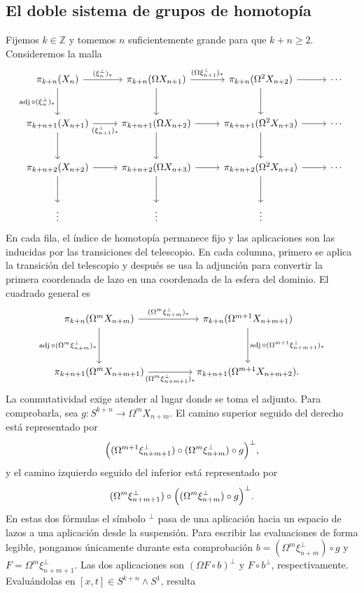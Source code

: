 \subsection{El doble sistema de grupos de homotopía}

Fijemos $k\in\mathbb Z$ y tomemos $n$ suficientemente grande para que $k+n\ge2$. Consideremos la malla
\[
\begin{tikzcd}[column sep=2.5em,row sep=large]
\pi_{k+n}(X_n)
\arrow[r,"(\xi_n^{\perp})_*"]
\arrow[d,"\operatorname{adj}\circ(\xi_n^{\perp})_*"']
& \pi_{k+n}(\Omega X_{n+1})
\arrow[r,"(\Omega\xi_{n+1}^{\perp})_*"] \arrow[d]
& \pi_{k+n}(\Omega^2X_{n+2}) \arrow[r] \arrow[d] & \cdots\\
\pi_{k+n+1}(X_{n+1}) \arrow[r,"(\xi_{n+1}^{\perp})_*"'] \arrow[d]
& \pi_{k+n+1}(\Omega X_{n+2}) \arrow[r] \arrow[d]
& \pi_{k+n+1}(\Omega^2X_{n+3}) \arrow[r] \arrow[d] & \cdots\\
\pi_{k+n+2}(X_{n+2}) \arrow[r] \arrow[d]
& \pi_{k+n+2}(\Omega X_{n+3}) \arrow[r] \arrow[d]
& \pi_{k+n+2}(\Omega^2X_{n+4}) \arrow[r] \arrow[d] & \cdots\\
\vdots & \vdots & \vdots
\end{tikzcd}
\]
En cada fila, el índice de homotopía permanece fijo y las aplicaciones son las inducidas por las transiciones del telescopio. En cada columna, primero se aplica la transición del telescopio y después se usa la adjunción para convertir la primera coordenada de lazo en una coordenada de la esfera del dominio. El cuadrado general es
\[
\begin{tikzcd}[column sep=4.5em,row sep=huge]
\pi_{k+n}(\Omega^mX_{n+m})
\arrow[r,"(\Omega^m\xi_{n+m}^{\perp})_*"]
\arrow[d,"\operatorname{adj}\circ(\Omega^m\xi_{n+m}^{\perp})_*"']
& \pi_{k+n}(\Omega^{m+1}X_{n+m+1})
\arrow[d,"\operatorname{adj}\circ(\Omega^{m+1}\xi_{n+m+1}^{\perp})_*"]\\
\pi_{k+n+1}(\Omega^mX_{n+m+1})
\arrow[r,"(\Omega^m\xi_{n+m+1}^{\perp})_*"']
& \pi_{k+n+1}(\Omega^{m+1}X_{n+m+2}).
\end{tikzcd}
\]
La conmutatividad exige atender al lugar donde se toma el adjunto. Para comprobarla, sea $g\colon S^{k+n}\to\Omega^mX_{n+m}$. El camino superior seguido del derecho está representado por
\[
\Bigl((\Omega^{m+1}\xi_{n+m+1}^{\perp})
\circ(\Omega^m\xi_{n+m}^{\perp})\circ g\Bigr)^{\perp},
\]
y el camino izquierdo seguido del inferior está representado por
\[
(\Omega^m\xi_{n+m+1}^{\perp})
\circ\Bigl((\Omega^m\xi_{n+m}^{\perp})\circ g\Bigr)^{\perp}.
\]
En estas dos fórmulas el símbolo ${}^{\perp}$ pasa de una aplicación hacia un espacio de lazos a una aplicación desde la suspensión. Para escribir las evaluaciones de forma legible, pongamos únicamente durante esta comprobación $b=(\Omega^m\xi_{n+m}^{\perp})\circ g$ y $F=\Omega^m\xi_{n+m+1}^{\perp}$. Las dos aplicaciones son $(\Omega F\circ b)^{\perp}$ y $F\circ b^{\perp}$, respectivamente. Evaluándolas en $[x,t]\in S^{k+n}\wedge S^1$, resulta
